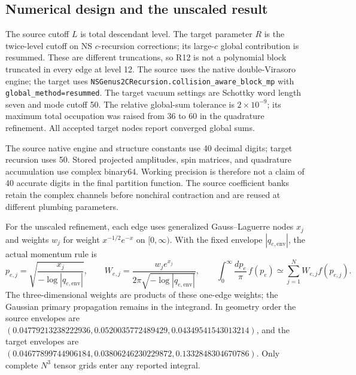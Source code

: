 \subsection{Numerical design and the unscaled result}

The source cutoff $L$ is total descendant level. The target
parameter $R$ is the twice-level cutoff on NS $c$-recursion
corrections; its large-$c$ global contribution is resummed.
These are different truncations, so R12 is not a polynomial
block truncated in every edge at level 12. The source uses the
native double-Virasoro engine; the target uses
\texttt{NSGenus2CRecursion.collision\_aware\_block\_mp} with
\texttt{global\_method=resummed}. The target vacuum settings are
Schottky word length seven and mode cutoff 50. The relative
global-sum tolerance is $2\times10^{-9}$; its maximum total
occupation was raised from 36 to 60 in the quadrature refinement.
All accepted target nodes report converged global sums.

The source native engine and structure constants use 40 decimal
digits; target recursion uses 50. Stored projected amplitudes,
spin matrices, and quadrature accumulation use complex binary64.
Working precision is therefore not a claim of 40 accurate digits
in the final partition function. The source coefficient banks
retain the complex channels before nonchiral contraction and
are reused at different plumbing parameters.

For the unscaled refinement, each edge uses generalized
Gauss--Laguerre nodes $x_j$ and weights $w_j$ for weight
$x^{-1/2}e^{-x}$ on $[0,\infty)$. With the fixed envelope
$|q_{e,\mathrm{env}}|$, the actual momentum rule is
\begin{equation}
 p_{e,j}=\sqrt{\frac{x_j}{-\log|q_{e,\mathrm{env}}|}},\qquad
 W_{e,j}=\frac{w_j e^{x_j}}
                  {2\pi\sqrt{-\log|q_{e,\mathrm{env}}|}},\qquad
 \int_0^\infty\frac{dp_e}{\pi}\,f(p_e)
       \simeq\sum_{j=1}^N W_{e,j}f(p_{e,j}).
 \label{eq:partition-quadrature}
\end{equation}
The three-dimensional weights are products of these one-edge
weights; the Gaussian primary propagation remains in the
integrand. In geometry order the source envelopes are
$(0.04779213238222936,0.0520035772489429,0.04349541543013214)$,
and the target envelopes are
$(0.04677899744906184,0.03806246230229872,0.1332848304670786)$.
Only complete $N^3$ tensor grids enter any reported integral.

